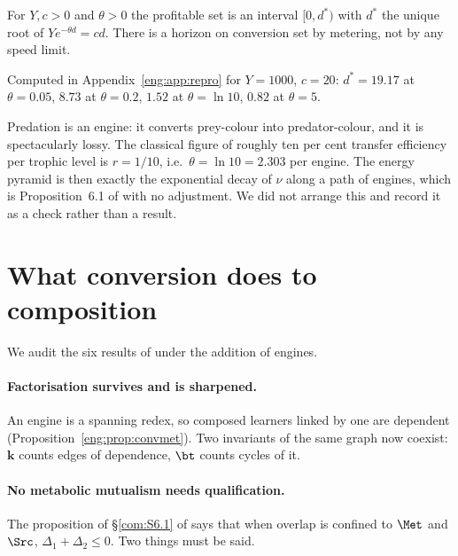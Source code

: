 \begin{proposition}\label{eng:prop:radius}
For $Y, c > 0$ and $\theta > 0$ the profitable set is an interval
$[0, d^\ast)$ with $d^\ast$ the unique root of $Y e^{-\theta d} = cd$.
There is a horizon on conversion set by metering, not by any speed limit.
\end{proposition}

Computed in Appendix~\ref{eng:app:repro} for $Y = 1000$, $c = 20$: $d^\ast =
19.17$ at $\theta = 0.05$, $8.73$ at $\theta = 0.2$, $1.52$ at $\theta =
\ln 10$, $0.82$ at $\theta = 5$.

\begin{remark}\label{eng:ecological-pyramid}
Predation is an engine: it converts prey-colour into predator-colour, and
it is spectacularly lossy. The classical figure of roughly ten per cent
transfer efficiency per trophic level \cite{lindeman} is
$r = 1/10$, i.e.\ $\theta = \ln 10 = 2.303$ per engine. The energy pyramid
is then exactly the exponential decay of $\nu$ along a path of engines,
which is Proposition~6.1 of \cite{vtok} with no adjustment. We did not
arrange this and record it as a check rather than a result.
\end{remark}

\section{What conversion does to composition}\label{eng:S7}
\label{eng:sec:audit}

We audit the six results of \chComp under the addition of engines.

\paragraph{Factorisation survives and is sharpened.} An engine is a
spanning redex, so composed learners linked by one are dependent
(Proposition~\ref{eng:prop:convmet}). Two invariants of the same graph now
coexist: $\mathbf{k}$ counts edges of dependence, $\bt$ counts cycles of
it.

\paragraph{No metabolic mutualism needs qualification.} The proposition of
\S\ref{com:S6.1} of \chComp says that when overlap is confined to $\Met$ and
$\Src$, $\Delta_1 + \Delta_2 \leq 0$. Two things must be said.

